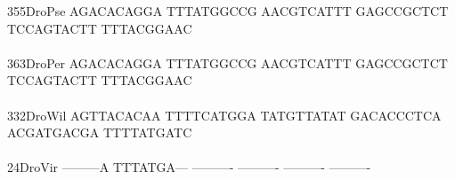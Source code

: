 \documentclass[11pt,twoside,reqno,a4paper]{article}
\begin{document}
{355\hspace*{1\charwidth}DroPse	AGACACAGGA	TTTATGGCCG	AACGTCATTT	GAGCCGCTCT	TCCAGTACTT	TTTACGGAAC	\\
\hspace*{4\charwidth}\hspace*{7\charwidth}\hspace*{1\charwidth}\hspace*{1\charwidth}\hspace*{1\charwidth}\hspace*{1\charwidth}\hspace*{1\charwidth}\hspace*{1\charwidth}\\
363\hspace*{1\charwidth}DroPer	AGACACAGGA	TTTATGGCCG	AACGTCATTT	GAGCCGCTCT	TCCAGTACTT	TTTACGGAAC	\\
\hspace*{4\charwidth}\hspace*{7\charwidth}\hspace*{1\charwidth}\hspace*{1\charwidth}\hspace*{1\charwidth}\hspace*{1\charwidth}\hspace*{1\charwidth}\hspace*{1\charwidth}\\
332\hspace*{1\charwidth}DroWil	AGTTACACAA	TTTTCATGGA	TATGTTATAT	GACACCCTCA	ACGATGACGA	TTTTATGATC	\\
\hspace*{4\charwidth}\hspace*{7\charwidth}\hspace*{1\charwidth}\hspace*{1\charwidth}\hspace*{1\charwidth}\hspace*{1\charwidth}\hspace*{1\charwidth}\hspace*{1\charwidth}\\
24\hspace*{2\charwidth}DroVir	---------A	TTTATGA---	----------	----------	----------	----------	\\
\hspace*{4\charwidth}\hspace*{7\charwidth}\hspace*{1\charwidth}\hspace*{1\charwidth}\hspace*{1\charwidth}\hspace*{1\charwidth}\hspace*{1\charwidth}\hspace*{1\charwidth}\\
}
\end{document}
